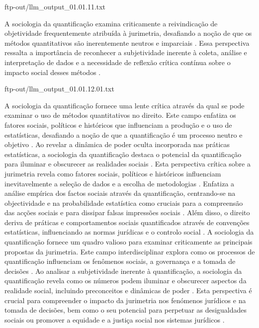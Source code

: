 ftp-out/llm_output_01.01.11.txt 

A sociologia da quantificação examina criticamente a reivindicação de objetividade frequentemente atribuída à jurimetria, desafiando a noção de que os métodos quantitativos são inerentemente neutros e imparciais \cite{10.1590/dados.2022.65. 3.267,10.1057/s41599-020-00557-0}. Essa perspectiva ressalta a importância de reconhecer a subjetividade inerente à coleta, análise e interpretação de dados e a necessidade de reflexão crítica contínua sobre o impacto social desses métodos \cite{10.5040/9781350220645,10.1080/07329113.2015.1046739}. 

ftp-out/llm_output_01.01.12.01.txt 

A sociologia da quantificação fornece uma lente crítica através da qual se pode examinar o uso de métodos quantitativos no direito. Este campo enfatiza os fatores sociais, políticos e históricos que influenciam a produção e o uso de estatísticas, desafiando a noção de que a quantificação é um processo neutro e objetivo \cite{10.1007/978-3-319-44000-215,10.3390/fi9040068} . Ao revelar a dinâmica de poder oculta incorporada nas práticas estatísticas, a sociologia da quantificação destaca o potencial da quantificação para iluminar e obscurecer as realidades sociais \cite{10.1007/978-3-319-44000-215,10.3390/fi9040068}. Esta perspectiva crítica sobre a jurimetria revela como fatores sociais, políticos e históricos influenciam inevitavelmente a seleção de dados e a escolha de metodologias \cite{10.1007/978-3-319-44000-215,10.3390/fi9040068}. Enfatiza a análise empírica dos factos sociais através da quantificação, centrando-se na objectividade e na probabilidade estatística como cruciais para a compreensão das acções sociais e para dissipar falsas impressões sociais \cite{sousa2024}. Além disso, o direito deriva de práticas e comportamentos sociais quantificados através de convenções estatísticas, influenciando as normas jurídicas e o controlo social \cite{ribeiro2021,sousa2024}. A sociologia da quantificação fornece um quadro valioso para examinar criticamente as principais propostas da jurimetria. Este campo interdisciplinar explora como os processos de quantificação influenciam os fenômenos sociais, a governança e a tomada de decisões \cite{101111lsi12334}. Ao analisar a subjetividade inerente à quantificação, a sociologia da quantificação revela como os números podem iluminar e obscurecer aspectos da realidade social, incluindo preconceitos e dinâmicas de poder \cite{101111lsi12334,101057s4159902003965}. Esta perspectiva é crucial para compreender o impacto da jurimetria nos fenómenos jurídicos e na tomada de decisões, bem como o seu potencial para perpetuar as desigualdades sociais ou promover a equidade e a justiça social nos sistemas jurídicos \cite{101111lsi12334,101057s4159902003965}. 

